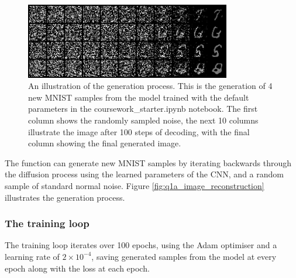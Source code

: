 \begin{figure}[t]
    \centering
    \includegraphics[width=0.8\textwidth]{figures/q1a_image_reconstruction}
    \caption{An illustration of the generation process.
        This is the generation of 4 new MNIST samples from the model trained with the default parameters in the
        coursework\_starter.ipynb notebook.
        The first column shows the randomly sampled noise, the next 10 columns illustrate the image after 100 steps of
        decoding, with the final column showing the final generated image.}
    \label{fig:q1a_image_reconstruction}
\end{figure}
The  function can generate new MNIST samples by iterating backwards through the diffusion process
using the learned parameters of the CNN, and a random sample of standard normal noise.
Figure \eqref{fig:q1a_image_reconstruction} illustrates the generation process.

\subsubsection{The training loop}\label{subsubsec:training-loop}
The training loop iterates over 100 epochs, using the Adam optimiser and a learning rate of $2 \times 10^{-4}$,
saving generated samples from the model at every epoch along with the loss at each epoch.
